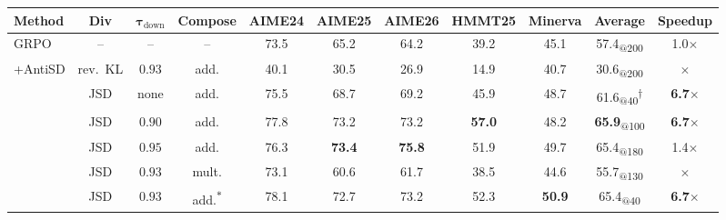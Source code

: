 \documentclass{llmxive}
\providecommand{\arraystretch}{0.95}
\begin{document}
\begin{table}[t]
  \centering
  \small
  \setlength{\tabcolsep}{1.5pt}
  \renewcommand{\arraystretch}{1.0}
  \begin{tabular}{l|ccc|cccccc|c}
    \toprule
    \textbf{Method}          & \textbf{Div} & $\boldsymbol{\tau_{\mathrm{down}}}$ & \textbf{Compose}             & \textbf{AIME24} & \textbf{AIME25} & \textbf{AIME26} & \textbf{HMMT25} & \textbf{Minerva} & \textbf{Average}                                   & \textbf{Speedup}     \\
    \midrule
    GRPO                     & --           & --                                  & --                           & 73.5            & 65.2            & 64.2            & 39.2            & 45.1             & 57.4\textsubscript{@200}                           & 1.0$\times$          \\
    \midrule
    \multirow{7}{*}{+AntiSD} & rev.~KL      & $0.93$                              & add.                         & 40.1            & 30.5            & 26.9            & 14.9            & 40.7             & 30.6\textsubscript{@200}                           & $\times$             \\
    \cmidrule{2-11}
                             & JSD          & none                                & add.                         & 75.5            & 68.7            & 69.2            & 45.9            & 48.7             & 61.6\textsubscript{@40}\textsuperscript{$\dagger$} & \textbf{6.7$\times$} \\
                             & JSD          & $0.90$                              & add.                         & 77.8            & 73.2            & 73.2            & \textbf{57.0}   & 48.2             & \textbf{65.9}\textsubscript{@100}                  & \textbf{6.7$\times$} \\
                             & JSD          & $0.95$                              & add.                         & 76.3            & \textbf{73.4}   & \textbf{75.8}   & 51.9            & 49.7             & 65.4\textsubscript{@180}                           & 1.4$\times$          \\
    \cmidrule{2-11}
                             & JSD          & $0.93$                              & mult.                        & 73.1            & 60.6            & 61.7            & 38.5            & 44.6             & 55.7\textsubscript{@130}                           & $\times$             \\
                             & JSD          & $0.93$                              & add.\textsuperscript{$\ast$} & 78.1            & 72.7            & 73.2            & 52.3            & \textbf{50.9}    & 65.4\textsubscript{@40}                            & \textbf{6.7$\times$} \\

\end{tabular}
\end{table}
\end{document}
